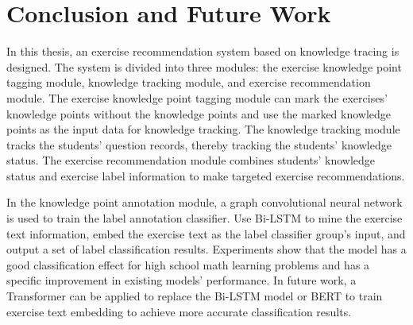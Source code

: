 \chapter{Conclusion and Future Work}

In this thesis, an exercise recommendation system based on knowledge tracing is designed. The system is divided into three modules: the exercise knowledge point tagging module, knowledge tracking module, and exercise recommendation module. The exercise knowledge point tagging module can mark the exercises' knowledge points without the knowledge points and use the marked knowledge points as the input data for knowledge tracking. The knowledge tracking module tracks the students' question records, thereby tracking the students' knowledge status. The exercise recommendation module combines students' knowledge status and exercise label information to make targeted exercise recommendations.


In the knowledge point annotation module, a graph convolutional neural network is used to train the label annotation classifier. Use Bi-LSTM to mine the exercise text information, embed the exercise text as the label classifier group's input, and output a set of label classification results. Experiments show that the model has a good classification effect for high school math learning problems and has a specific improvement in existing models' performance. In future work, a Transformer can be applied to replace the Bi-LSTM model or BERT to train exercise text embedding to achieve more accurate classification results.


